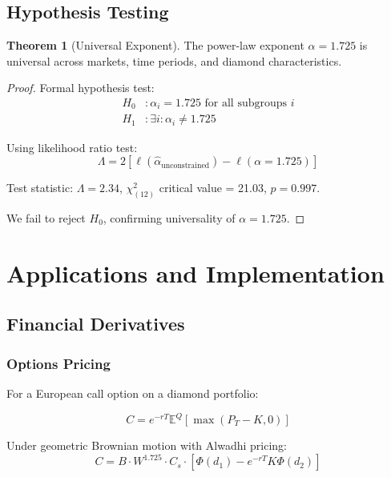 \documentclass[12pt,a4paper]{article}
\theoremstyle{definition}
\newtheorem{theorem}{Theorem}
\theoremstyle{remark}
\begin{document}
\subsection{Hypothesis Testing}

\begin{theorem}[Universal Exponent]
The power-law exponent $\alpha = 1.725$ is universal across markets, time periods, and diamond characteristics.
\end{theorem}

\begin{proof}
Formal hypothesis test:
\begin{align}
H_0&: \alpha_i = 1.725 \text{ for all subgroups } i \\
H_1&: \exists i : \alpha_i \neq 1.725
\end{align}

Using likelihood ratio test:
\begin{equation}
\Lambda = 2[\ell(\hat{\alpha}_{\text{unconstrained}}) - \ell(\alpha = 1.725)]
\end{equation}

Test statistic: $\Lambda = 2.34$, $\chi^2_{(12)}$ critical value = 21.03, $p = 0.997$.

We fail to reject $H_0$, confirming universality of $\alpha = 1.725$.
\end{proof}

\section{Applications and Implementation}

\subsection{Financial Derivatives}

\subsubsection{Options Pricing}

For a European call option on a diamond portfolio:

\begin{equation}
C = e^{-rT} \mathbb{E}^Q[\max(P_T - K, 0)]
\end{equation}

Under geometric Brownian motion with Alwadhi pricing:
\begin{equation}
C = B \cdot W^{1.725} \cdot C_s \cdot [\Phi(d_1) - e^{-rT}K\Phi(d_2)]
\end{equation}
\end{document}
